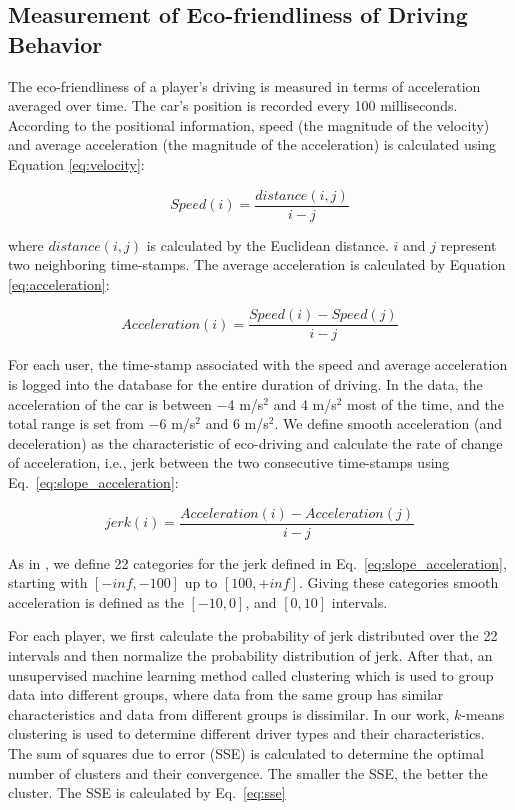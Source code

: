\documentclass[preprint,authoryear,12pt]{elsarticle}
\begin{document}
\subsection{Measurement of Eco-friendliness of Driving Behavior}
\label{sec:measureEco}

The eco-friendliness of a player's driving is measured in terms of acceleration averaged over time.  The car's position is recorded every 100 milliseconds. According to the positional information, speed (the magnitude of the velocity) and average acceleration (the magnitude of the acceleration) is calculated using Equation \ref{eq:velocity}:

\begin{equation}\label{eq:velocity}
Speed(i) = \frac{distance(i,j)}{i-j}
\end{equation}

where $distance(i,j)$ is calculated by the Euclidean distance. $i$ and $j$ represent two neighboring time-stamps. The average acceleration is calculated by Equation \ref{eq:acceleration}:

\begin{equation}\label{eq:acceleration}
Acceleration(i) = \frac{Speed(i) - Speed(j)}{i-j}
\end{equation}

For each user, the time-stamp associated with the speed and average acceleration is logged into the database for the entire duration of driving. In the data, the acceleration of the car is between $-$4 m/s$^2$ and 4 m/s$^2$ most of the time, and the total range is set from $-$6 m/s$^2$ and 6 m/s$^2$.  We define smooth acceleration (and deceleration) as the characteristic of eco-driving and calculate the rate of change of acceleration, i.e., jerk between the two consecutive time-stamps using Eq.~\ref{eq:slope_acceleration}:

\begin{equation}\label{eq:slope_acceleration}
jerk(i) = \frac{Acceleration(i) - Acceleration(j)}{i-j}
\end{equation}

As in \cite{prendingeroliveira2014}, we define 22 categories for the jerk defined in Eq.~\ref{eq:slope_acceleration},
starting with $[-inf , -100]$ up to $[100, +inf]$. Giving these categories smooth acceleration is defined as the $[-10, 0]$, and $[0, 10]$ intervals.

For each player, we first calculate the probability of jerk distributed over the 22 intervals and then normalize the probability distribution of jerk.
After that, an unsupervised machine learning method called clustering which is used to group data into different groups, where data from the same group has similar characteristics and data from different groups is dissimilar.
In our work, $k$-means clustering is used \citep{KMEAN.1979} to determine different driver types and their characteristics. The sum of squares due to error (SSE) is calculated to determine the optimal number of clusters and their convergence.  The smaller the SSE, the better the cluster. The SSE is calculated by Eq.~\ref{eq:sse}
\end{document}
